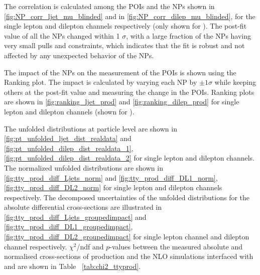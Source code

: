 The correlation is calculated among the POIs and the NPs shown in \cref{fig:NP_corr_ljet_mu_blinded} and in \cref{fig:NP_corr_dilep_mu_blinded}, for the single lepton and dilepton channels respectively (only shown for \ptgamma ). The post-fit value of all the NPs changed within 1 $\sigma$, with a large fraction of the NPs having very small pulls and constraints, which indicates that the fit is robust and not affected by any unexpected behavior of the NPs. %

The impact of the NPs on the measurement of the POIs is shown using the Ranking plot. The impact is calculated by varying each NP by $\pm 1 \sigma$ while keeping others at the post-fit value and measuring the change in the POIs. Ranking plots are shown in \cref{fig:ranking_ljet_prod} and \cref{fig:ranking_dilep_prod} for single lepton and dilepton channels (shown for \ptgamma).%

The unfolded distributions at particle level are shown in \cref{fig:pt_unfolded_ljet_dist_realdata} and \cref{fig:pt_unfolded_dilep_dist_realdata_1}, \cref{fig:pt_unfolded_dilep_dist_realdata_2} for single lepton and dilepton channels. The normalized unfolded distributions are shown in \cref{fig:tty_prod_diff_Ljets_norm} and \cref{fig:tty_prod_diff_DL1_norm}, \cref{fig:tty_prod_diff_DL2_norm} for single lepton and dilepton channels respectively. The decomposed uncertainties of the unfolded distributions for the absolute differential cross-sections are illustrated in \cref{fig:tty_prod_diff_Ljets_groupedimpact} and \cref{fig:tty_prod_diff_DL1_groupedimpact}, \cref{fig:tty_prod_diff_DL2_groupedimpact} for single lepton channel and dilepton channel respectively. $\chi^2$/ndf and $p$-values between the measured absolute and normalised cross-sections of \tty production and the NLO \MGNLO simulations interfaced with \PYTHIA[8] and \HERWIG[7] are shown in Table ~\ref{tab:chi2_ttyprod}.


